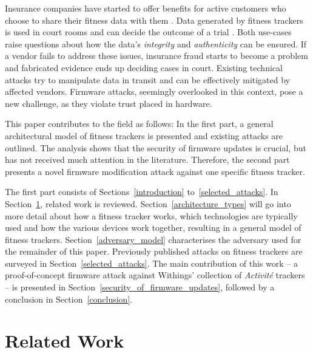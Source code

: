 \documentclass[english]{lni}
\begin{document}
Insurance companies have started to offer benefits for active customers who choose to share their fitness data with them \cite{Be15}. Data generated by fitness trackers is used in court rooms and can decide the outcome of a trial \cite{Hi15, Ol14}.
Both use-cases raise questions about how the data's \emph{integrity} and \emph{authenticity} can be ensured. If a vendor fails to address these issues, insurance fraud starts to become a problem and fabricated evidence ends up deciding cases in court. Existing technical attacks try to manipulate data in transit and can be effectively mitigated by affected vendors. Firmware attacks, seemingly overlooked in this context, pose a new challenge, as they violate trust placed in hardware.

\clearpage
\pagestyle{fancy}
\fancyhead{} 
\fancyfoot{} \renewcommand{\headrulewidth}{0.4pt} 

This paper contributes to the field as follows: In the first part, a general architectural model of fitness trackers is presented and existing attacks are outlined. The analysis shows that the security of firmware updates is crucial, but has not received much attention in the literature. Therefore, the second part presents a novel firmware modification attack against one specific fitness tracker.

The first part consists of Sections~\ref{introduction} to~\ref{selected_attacks}. In Section~\ref{related_work}, related work is reviewed. Section~\ref{architecture_types} will go into more detail about how a fitness tracker works, which technologies are typically used and how the various devices work together, resulting in a general model of fitness trackers. Section~\ref{adversary_model} characterises the adversary used for the remainder of this paper. Previously published attacks on fitness trackers are surveyed in Section~\ref{selected_attacks}. The main contribution of this work -- a proof-of-concept firmware attack against Withings' collection of \emph{Activité} trackers -- is presented in Section~\ref{security_of_firmware_updates}, followed by a conclusion in Section~\ref{conclusion}.

\section{Related Work}
\label{related_work}
\end{document}
